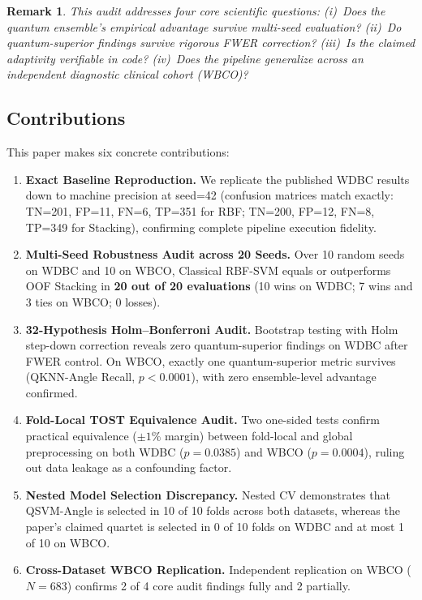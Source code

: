 \documentclass[journal,twocolumn]{IEEEtran}
\newtheorem{remark}{Remark}
\begin{document}
\begin{remark}
This audit addresses four core scientific questions: (i)~Does the quantum ensemble's empirical advantage survive multi-seed evaluation? (ii)~Do quantum-superior findings survive rigorous FWER correction? (iii)~Is the claimed adaptivity verifiable in code? (iv)~Does the pipeline generalize across an independent diagnostic clinical cohort (WBCO)?
\end{remark}

\subsection{Contributions}

This paper makes six concrete contributions:
\begin{enumerate}
    \item \textbf{Exact Baseline Reproduction.} We replicate the published WDBC results down to machine precision at seed=42 (confusion matrices match exactly: TN=201, FP=11, FN=6, TP=351 for RBF; TN=200, FP=12, FN=8, TP=349 for Stacking), confirming complete pipeline execution fidelity.
    \item \textbf{Multi-Seed Robustness Audit across 20 Seeds.} Over 10 random seeds on WDBC and 10 on WBCO, Classical RBF-SVM equals or outperforms OOF Stacking in \textbf{20 out of 20 evaluations} (10 wins on WDBC; 7 wins and 3 ties on WBCO; 0 losses).
    \item \textbf{32-Hypothesis Holm--Bonferroni Audit.} Bootstrap testing with Holm step-down correction reveals zero quantum-superior findings on WDBC after FWER control. On WBCO, exactly one quantum-superior metric survives (QKNN-Angle Recall, $p < 0.0001$), with zero ensemble-level advantage confirmed.
    \item \textbf{Fold-Local TOST Equivalence Audit.} Two one-sided tests confirm practical equivalence ($\pm 1\%$ margin) between fold-local and global preprocessing on both WDBC ($p = 0.0385$) and WBCO ($p = 0.0004$), ruling out data leakage as a confounding factor.
    \item \textbf{Nested Model Selection Discrepancy.} Nested CV demonstrates that QSVM-Angle is selected in 10 of 10 folds across both datasets, whereas the paper's claimed quartet is selected in 0 of 10 folds on WDBC and at most 1 of 10 on WBCO.
    \item \textbf{Cross-Dataset WBCO Replication.} Independent replication on WBCO ($N=683$) confirms 2 of 4 core audit findings fully and 2 partially.
\end{enumerate}
\end{document}
